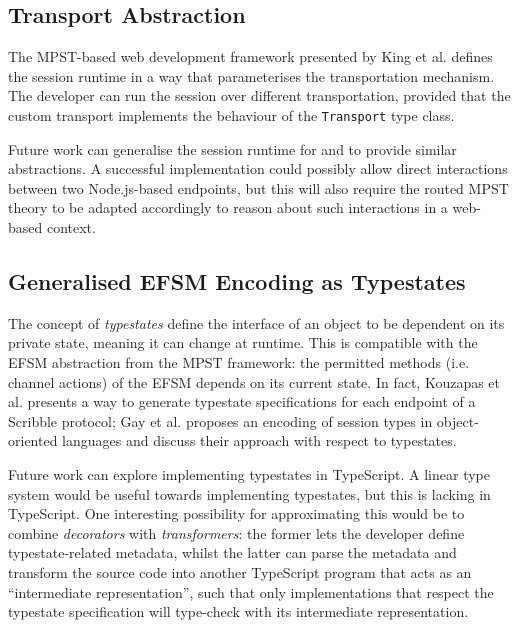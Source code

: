\subsection{Transport Abstraction}
The MPST-based web development framework presented by 
King et al. \cite{PureScript2019} defines the session runtime
in a way that parameterises the transportation mechanism.
The developer can run the session over different transportation,
provided that the custom transport implements the behaviour
of the \texttt{Transport} type class.

Future work can generalise the session runtime for 
 and  to provide
similar abstractions. A successful implementation could
possibly allow direct interactions between two Node.js-based
endpoints, but this will also require the routed MPST
theory to be adapted accordingly to reason about
such interactions in a web-based context.

\subsection{Generalised EFSM Encoding as Typestates}
The concept of \textit{typestates} define the interface of
an object to be dependent on its private state, meaning
it can change at runtime.
This is compatible with the EFSM abstraction from the
MPST framework: the permitted methods (i.e. channel actions)
of the EFSM depends on its current state.
In fact, Kouzapas et al. \cite{StMungo} presents a way to
generate typestate specifications for each endpoint of a
Scribble protocol; Gay et al. \cite{ModularST} proposes
an encoding of session types in object-oriented languages
and discuss their approach with respect to typestates.

Future work can explore implementing typestates
in TypeScript. A linear type system would be useful towards 
implementing typestates, but this is lacking in TypeScript.
One interesting possibility for approximating this would
be to combine \textit{decorators} with \textit{transformers}:
the former lets the developer define typestate-related metadata,
whilst the latter can parse the metadata and
transform the source code into another TypeScript program that acts
as an ``intermediate representation'',
such that only implementations that respect the typestate specification
will type-check with its intermediate representation.